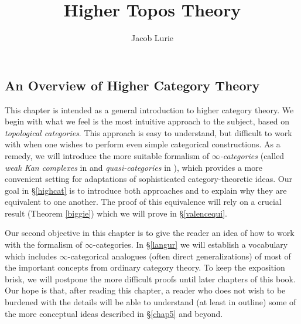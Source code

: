 \documentclass{report}[10pt, final]
\theoremstyle{definition}
\begin{document}
\title{Higher Topos Theory}
\author{Jacob Lurie}


\begin{intro}

\end{intro}
\begin{TOC}
\tableofcontents
\end{TOC}

\begin{chapter1}
\chapter{An Overview of Higher Category Theory}\label{chap1}
\setcounter{theorem}{0}
\setcounter{subsection}{0}
This chapter is intended as a general introduction to higher category theory. We begin with what we feel is the most intuitive approach to the subject, based on {\it topological categories}. This approach is easy to understand, but difficult to work with when one wishes to perform even simple categorical constructions. As a remedy, we will introduce the more suitable formalism of {\it $\infty$-categories} (called
{\it weak Kan complexes} in \cite{quasicat} and {\it quasi-categories} in \cite{joyalpub}), which
provides a more convenient setting for adaptations of sophisticated category-theoretic ideas.
Our goal in \S \ref{highcat} is to introduce both approaches and to explain why they are equivalent to one another. The proof of this equivalence will rely on a crucial result (Theorem \ref{biggie}) which we will prove in \S \ref{valencequi}.

Our second objective in this chapter is to give the reader an idea of how to work with the formalism of $\infty$-categories. In \S \ref{langur} we will establish a vocabulary which includes $\infty$-categorical analogues (often direct generalizations) of most of the important concepts from ordinary category theory. To keep the exposition brisk, we will postpone the more difficult proofs until later chapters of this book. Our hope is that, after reading this chapter, a reader who does not wish to be burdened with the details will be able to understand (at least in outline) some of the more conceptual ideas described in \S \ref{chap5} and beyond.

\begin{Already Read}

\end{Already Read}

\end{chapter1}
\end{document}
